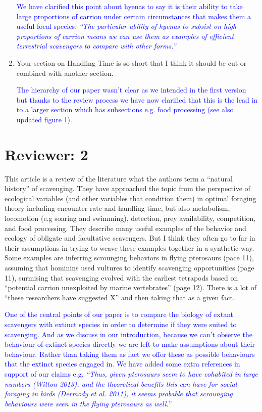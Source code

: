 \documentclass[12pt,letterpaper]{article}
\begin{document}
\begin{enumerate}
\textcolor{blue}{We have clarified this point about hyenas to say it is their ability to take large proportions of carrion under certain circumstances that makes them a useful focal species: \textit{``The particular ability of hyenas to subsist on high proportions of carrion means we can use them as examples of efficient terrestrial scavengers to compare with other forms.''}}

\item{Your section on Handling Time is so short that I think it should be cut or combined with another section.}

\textcolor{blue}{The hierarchy of our paper wasn't clear as we intended in the first version but thanks to the review process we have now clarified that this is the lead in to a larger section which has subsections e.g. food processing (see also updated figure 1).} 

\end{enumerate}

\section{Reviewer: 2}
This article is a review of the literature what the authors term a ``natural history'' of scavenging.
They have approached the topic from the perspective of ecological variables (and other variables that condition them) in optimal foraging theory including encounter rate and handling time, but also metabolism, locomotion (e.g soaring and swimming), detection, prey availability, competition, and food processing.
They describe many useful examples of the behavior and ecology of obligate and facultative scavengers.
But I think they often go to far in their assumptions in trying to weave these examples together in a synthetic way.
Some examples are inferring scrounging behaviors in flying pterosaurs (pace 11), assuming that hominins used vultures to identify scavenging opportunities (page 11), surmising that scavenging evolved with the earliest tetrapods based on ``potential carrion unexploited by marine vertebrates'' (page 12).
There is a lot of ``these researchers have suggested X'' and then taking that as a given fact.

\bigskip
\textcolor{blue}{One of the central points of our paper is to compare the biology of extant scavengers with extinct species in order to determine if they were suited to scavenging.
And as we discuss in our introduction, because we can't observe the behaviour of extinct species directly we are left to make assumptions about their behaviour. 
Rather than taking them as fact we offer these as possible behaviours that the extinct species engaged in.
We have added some extra references in support of our claims e.g. \textit {``Thus, given pterosaurs seem to have cohabited in large numbers (Witton 2013), and the theoretical benefits this can have for social foraging in birds (Dermody et al. 2011), it seems probable that scrounging behaviours were seen in the flying pterosaurs as well.''}}
\end{document}
